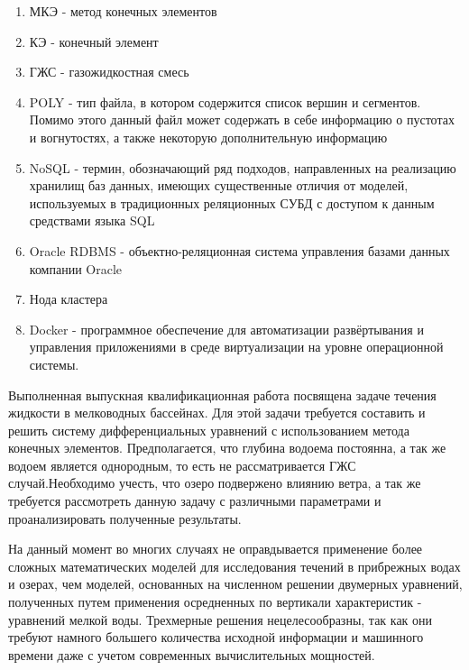\documentclass[14pt]{extreport}
\begin{document}


\tableofcontents

\abbreviations

\begin{enumerate}
\item МКЭ - метод конечных элементов
\item КЭ - конечный элемент
\item ГЖС - газожидкостная смесь
\item POLY - тип файла, в котором содержится список вершин и сегментов. Помимо этого данный файл может содержать в себе информацию о пустотах и вогнутостях, а также некоторую дополнительную информацию\cite{bib:website:quake:poly}
\item NoSQL - термин, обозначающий ряд подходов, направленных на реализацию хранилищ баз данных, имеющих существенные отличия от моделей, используемых в традиционных реляционных СУБД с доступом к данным средствами языка SQL
\item Oracle RDBMS - объектно-реляционная система управления базами данных компании Oracle
\item Нода кластера
\item Docker - программное обеспечение для автоматизации развёртывания и управления приложениями в среде виртуализации на уровне операционной системы. 
\end{enumerate}

\intro

Выполненная выпускная квалификационная работа посвящена задаче течения жидкости в мелководных бассейнах. Для этой задачи требуется составить и решить систему дифференциальных уравнений с использованием метода конечных элементов. Предполагается, что глубина водоема постоянна, а так же водоем является однородным, то есть не рассматривается ГЖС случай.Необходимо учесть, что озеро подвержено влиянию ветра, а так же требуется рассмотреть данную задачу с различными параметрами и проанализировать полученные результаты.

На данный момент во многих случаях не оправдывается применение более сложных математических моделей для исследования течений в прибрежных водах и озерах, чем моделей, основанных на численном решении двумерных уравнений, полученных путем применения осредненных по вертикали характеристик - уравнений мелкой воды. Трехмерные решения нецелесообразны, так как они требуют намного большего количества исходной информации и машинного времени даже с учетом современных вычислительных мощностей.
\end{document}

